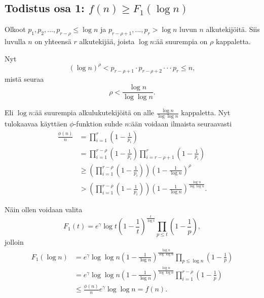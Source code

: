 \documentclass{article}
\theoremstyle{definition}
\begin{document}
\subsection{Todistus osa 1: $f(n) \geq F_1(\log n)$}

Olkoot $p_1,p_2,...,p_{r-\rho} \leq \log n$ ja $p_{r-\rho+1},...,p_r > \log n$ luvun $n$ alkutekijöitä. Siis luvulla $n$ on yhteensä $r$ alkutekijää, joista $\log n$:ää suurempia on $\rho$ kappaletta.

Nyt
\begin{equation}
    (\log n)^\rho < p_{r-\rho+1} \cdot p_{r-\rho+2} \cdot \cdot \cdot p_r \leq n,
\end{equation}
mistä seuraa
\begin{equation}
    \rho < \frac{\log n}{\log\log n}.
\end{equation}

Eli $\log n$:ää suurempia alkulukutekijöitä on alle $\frac{\log n}{\log\log n}$ kappaletta.
Nyt tulokaavaa käyttäen $\phi$-funktion suhde $n$:ään voidaan ilmaista seuraavasti
\begin{align}
    \frac{\phi(n)}{n} & = \prod_{i=1}^r(1-\frac{1}{p_i})\\
    & = \prod_{i=1}^{r-\rho}(1-\frac{1}{p_i}) \prod_{i=r-\rho+1}^r(1-\frac{1}{p_i})\\
    & \geq \left(\prod_{i=1}^{r-\rho}(1-\frac{1}{p_i})\right) (1-\frac{1}{\log n})^\rho\\
    & > \left(\prod_{i=1}^{r-\rho}(1-\frac{1}{p_i})\right) (1-\frac{1}{\log n})^\frac{\log n}{\log \log n}.
\end{align}

Näin ollen voidaan valita
\begin{equation*}
    F_1(t)=e^\gamma \log t \left(1-\frac{1}{t}\right)^\frac{t}{\log t} \prod_{p\leq t} \left(1-\frac{1}{p}\right),
\end{equation*}
jolloin
\begin{align*}
    F_1(\log n) & = e^\gamma \log \log n \left(1-\frac{1}{\log n}\right)^\frac{\log n}{\log \log n} \prod_{p\leq \log n} \left(1-\frac{1}{p}\right)\\
    & = e^\gamma \log \log n \left(1-\frac{1}{\log n}\right)^\frac{\log n}{\log \log n} \prod_{i=1}^{r-\rho} \left(1-\frac{1}{p}\right)\\
    & \leq \frac{\phi(n)}{n} e^\gamma \log\log n = f(n).
\end{align*}
\end{document}
